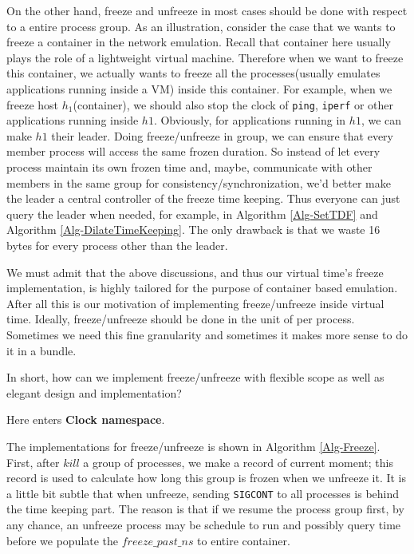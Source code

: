 \documentclass{acm_proc_article-sp}
\begin{document}
On the other hand, freeze and unfreeze in most cases should be done with respect to a entire process group. As an illustration, consider the case that we wants to freeze a container in the network emulation. 
Recall that container here usually plays the role of a lightweight virtual machine. Therefore when we want to freeze this container, we actually wants to freeze all the processes(usually emulates applications running inside a VM) inside this container. 
For example, when we freeze host $h_1$(container), we should also stop the clock of \texttt{ping}, \texttt{iperf} or other applications running inside $h1$. Obviously, for applications running in $h1$, we can make $h1$ their leader.
Doing freeze/unfreeze in group, we can ensure that every member process will access the same frozen duration.
So instead of let every process maintain its own frozen time and, maybe, communicate with other members in the same group for consistency/synchronization, we'd better make the leader a central controller of the freeze time keeping. 
Thus everyone can just query the leader when needed, for example, in Algorithm \ref{Alg-SetTDF} and Algorithm \ref{Alg-DilateTimeKeeping}.
The only drawback is that we waste 16 bytes for every process other than the leader.

We must admit that the above discussions, and thus our virtual time's freeze implementation, is highly tailored for the purpose of container based emulation. After all this is our motivation of implementing freeze/unfreeze inside virtual time. 
Ideally, freeze/unfreeze should be done in the unit of per process. 
Sometimes we need this fine granularity and sometimes it makes more sense to do it in a bundle. 

In short, how can we implement freeze/unfreeze with flexible scope as well as elegant design and implementation? 

Here enters \textbf{Clock namespace}.

The implementations for freeze/unfreeze is shown in Algorithm \ref{Alg-Freeze}. 
First, after $kill$ a group of processes, we make a record of current moment; this record is used to calculate how long this group is frozen when we unfreeze it. It is a little bit subtle that when unfreeze, sending \texttt{SIGCONT} to all processes  is behind the time keeping part. 
The reason is that if we resume the process group first, by any chance, an unfreeze process may be schedule to run and possibly query time before we populate the $freeze\_past\_ns$ to entire container.
\end{document}
